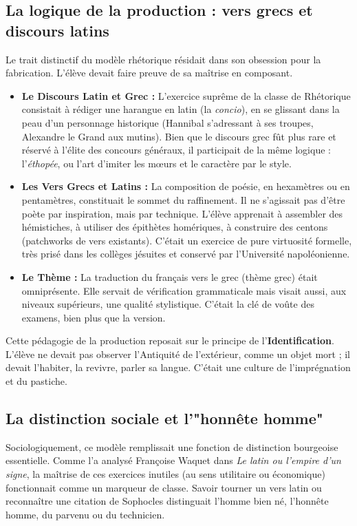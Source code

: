\subsection{La logique de la production : vers grecs et discours latins}

Le trait distinctif du modèle rhétorique résidait dans son obsession pour la \og fabrication\fg{}.
L'élève devait faire preuve de sa maîtrise en composant.

\begin{itemize}\item \textbf{Le Discours Latin et Grec :} L'exercice suprême de la classe de Rhétorique consistait à rédiger une harangue en latin (la \textit{concio}), en se glissant dans la peau d'un personnage historique (Hannibal s'adressant à ses troupes, Alexandre le Grand aux mutins). Bien que le discours grec fût plus rare et réservé à l'élite des concours généraux, il participait de la même logique : l'\textit{éthopée}, ou l'art d'imiter les mœurs et le caractère par le style.\cite{I-1-1-ref9}\item \textbf{Les Vers Grecs et Latins :} La composition de poésie, en hexamètres ou en pentamètres, constituait le sommet du raffinement. Il ne s'agissait pas d'être poète par inspiration, mais par technique. L'élève apprenait à assembler des hémistiches, à utiliser des épithètes homériques, à construire des centons (patchworks de vers existants). C'était un exercice de pure virtuosité formelle, très prisé dans les collèges jésuites et conservé par l'Université napoléonienne.\cite{I-1-1-ref9}\item \textbf{Le Thème :} La traduction du français vers le grec (thème grec) était omniprésente. Elle servait de vérification grammaticale mais visait aussi, aux niveaux supérieurs, une qualité stylistique. C'était la clé de voûte des examens, bien plus que la version.\cite{I-1-1-ref11}\end{itemize}Cette pédagogie de la production reposait sur le principe de l'\textbf{Identification}. L'élève ne
devait pas observer l'Antiquité de l'extérieur, comme un objet mort ; il devait l'habiter, la
revivre, parler sa langue. C'était une culture de l'imprégnation et du pastiche.



\subsection{La distinction sociale et l'"honnête homme"}

Sociologiquement, ce modèle remplissait une fonction de distinction bourgeoise essentielle. Comme
l'a analysé Françoise Waquet dans \textit{Le latin ou l'empire d'un signe}, la maîtrise de ces
exercices \og inutiles\fg{} (au sens utilitaire ou économique) fonctionnait comme un marqueur de
classe.\cite{I-1-1-ref14} Savoir tourner un vers latin ou reconnaître une citation de Sophocles
distinguait l'homme bien né, l'\og honnête homme\fg{}, du parvenu ou du technicien.

